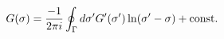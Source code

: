 \begin{equation}
\label{antider}
G(\sigma )=\frac{-1}{2\pi i}\oint_{\Gamma} d\sigma'G'(\sigma')\ln (\sigma'-\sigma )+{\rm const.}
\end{equation}


